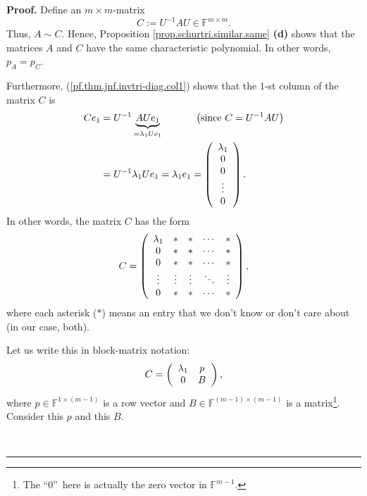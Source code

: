 \documentclass[numbers=enddot,12pt,final,onecolumn,notitlepage]{scrartcl}%
\numberwithin{exer}{subsection}
\theoremstyle{definition}
\newenvironment{proof}[1][Proof]{\noindent\textbf{#1.} }{\ \rule{0.5em}{0.5em}}
\begin{document}
\begin{proof}
Define an $m\times m$-matrix%
\[
C:=U^{-1}AU\in\mathbb{F}^{m\times m}.
\]
Thus, $A\sim C$. Hence, Proposition \ref{prop.schurtri.similar.same}
\textbf{(d)} shows that the matrices $A$ and $C$ have the same characteristic
polynomial. In other words, $p_{A}=p_{C}$.

Furthermore, (\ref{pf.thm.jnf.invtri-diag.col1}) shows that the $1$-st column
of the matrix $C$ is%
\begin{align*}
Ce_{1}  &  =U^{-1}\underbrace{AUe_{1}}_{=\lambda_{1}Ue_{1}}%
\ \ \ \ \ \ \ \ \ \ \left(  \text{since }C=U^{-1}AU\right) \\
&  =U^{-1}\lambda_{1}Ue_{1}=\lambda_{1}e_{1}=\left(
\begin{array}
[c]{c}%
\lambda_{1}\\
0\\
0\\
\vdots\\
0
\end{array}
\right)  .
\end{align*}
In other words, the matrix $C$ has the form%
\[
C=\left(
\begin{array}
[c]{ccccc}%
\lambda_{1} & \ast & \ast & \cdots & \ast\\
0 & \ast & \ast & \cdots & \ast\\
0 & \ast & \ast & \cdots & \ast\\
\vdots & \vdots & \vdots & \ddots & \vdots\\
0 & \ast & \ast & \cdots & \ast
\end{array}
\right)  ,
\]
where each asterisk ($\ast$) means an entry that we don't know or don't care
about (in our case, both).

Let us write this in block-matrix notation:%
\begin{equation}
C=\left(
\begin{array}
[c]{cc}%
\lambda_{1} & p\\
0 & B
\end{array}
\right)  , \label{pf.thm.jnf.invtri-diag.C=2x2}%
\end{equation}
where $p\in\mathbb{F}^{1\times\left(  m-1\right)  }$ is a row vector and
$B\in\mathbb{F}^{\left(  m-1\right)  \times\left(  m-1\right)  }$ is a
matrix\footnote{The \textquotedblleft$0$\textquotedblright\ here is actually
the zero vector in $\mathbb{F}^{m-1}$.}. Consider this $p$ and this $B$.


\end{proof}
\end{document}
